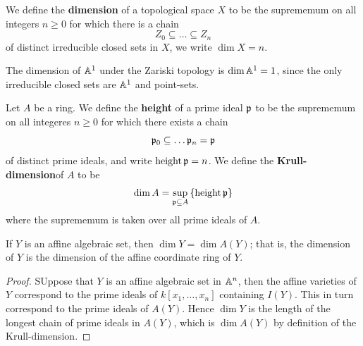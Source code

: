 \begin{definition}
    We define the \textbf{dimension} of a topological space $X$ to be the
    suprememum on all integers  $n \geq 0$ for which there is a chain
    \begin{equation*}
        Z_0 \subseteq \dots \subseteq Z_n
    \end{equation*}
    of distinct irreducible closed sets in $X$, we write  $\dim{X}=n$.
\end{definition}

\begin{example}\label{example_1.6}
    The dimension of $\mathbb{A}^1$ under the Zariski topology is  $\dim{\mathbb{A}^1}=1$, since
    the only irreducible closed sets are $\mathbb{A}^1$ and point-sets.
\end{example}

\begin{definition}
    Let $A$ be a ring. We define the  \textbf{height} of a prime ideal $\mathfrak{p}$ to
    be the suprememum on all integeres  $n \geq 0$ for which there exists a
    chain
    \begin{equation*}
        \mathfrak{p}_0 \subseteq \dots \mathfrak{p}_n=\mathfrak{p}
    \end{equation*}
    of distinct prime ideals, and write $\operatorname{height}{\mathfrak{p}}=n$. We define the
    \textbf{Krull-dimension}of $A$ to be
    \begin{equation*}
        \dim{A}=\sup_{\mathfrak{p} \subseteq A}{\{\operatorname{height}{\mathfrak{p}}\}}
    \end{equation*}
    where the suprememum is taken over all prime ideals of $A$.
\end{definition}

\begin{lemma}\label{1.1.6}
    If $Y$ is an affine algebraic set, then  $\dim{Y}=\dim{A(Y)}$; that is, the
    dimension of $Y$ is the dimension of the affine coordinate ring of  $Y$.
\end{lemma}
\begin{proof}
    SUppose that $Y$ is an affine algebraic set in  $\mathbb{A}^n$, then the affine
    varieties of  $Y$ correspond to the prime ideals of  $k[x_1, \dots, x_n]$
    containing $I(Y)$. This in turn correspond to the prime ideals of $A(Y)$.
    Hence $\dim{Y}$ is the length of the longest chain of prime ideals in
    $A(Y)$, which is $\dim{A(Y)}$ by definition of the Krull-dimension.
\end{proof}

